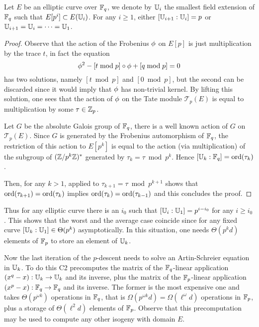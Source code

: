 \begin{proposition}
  \label{th:tower}
  Let $E$ be an elliptic curve over $\mathbb{F}_q$, we denote by $\mathbb{U}_i$ the
  smallest field extension of $\mathbb{F}_q$ such that $E[p^i]\subset
  E(\mathbb{U}_i)$. For any $i\ge1$, either $[\mathbb{U}_{i+1}:\mathbb{U}_i] = p$ or
  $\mathbb{U}_{i+1}=\mathbb{U}_i=\cdots=\mathbb{U}_1$.
\end{proposition}
\begin{proof}
  Observe that the action of the Frobenius $\phi$ on $E[p]$ is
  just multiplication by the trace $t$, in fact the equation
  \[\phi^2 - [t \bmod p]\circ\phi + [q \bmod p] = 0\]
  has two solutions, namely $[t \bmod p]$ and $[0 \bmod p]$, but the
  second can be discarded since it would imply that $\phi$ has
  non-trivial kernel.  By lifting this solution, one sees that the
  action of $\phi$ on the Tate module $\mathcal{T}_p(E)$ is equal
  to multiplication by some $\tau\in\mathbb{Z}_p$.

  Let $G$ be the absolute Galois group of $\mathbb{F}_q$, there is a well
  known action of $G$ on $\mathcal{T}_p(E)$. Since $G$ is generated by
  the Frobenius automorphism of $\mathbb{F}_q$, the restriction of this action
  to $E[p^k]$ is equal to the action (via multiplication) of the
  subgroup of $(\mathbb{Z}/p^k\mathbb{Z})^\ast$ generated by $\tau_k = \tau \bmod
  p^k$. Hence $[\mathbb{U}_k:\mathbb{F}_q] = \operatorname{ord}(\tau_k)$.

  Then, for any $k>1$, \cite[Corollary 4]{Ler97} applied to
  $\tau_{k+1}=\tau\bmod p^{k+1}$ shows that
  $\operatorname{ord}(\tau_{k+1})=\operatorname{ord}(\tau_k)$ implies
  $\operatorname{ord}(\tau_k)=\operatorname{ord}(\tau_{k-1})$ and this concludes the proof.
\end{proof}

Thus for any elliptic curve there is an $i_0$ such that $[\mathbb{U}_i:\mathbb{U}_1] =
p^{i-i_0}$ for any $i \ge i_0$. This shows that the worst and the
average case coincide since for any fixed curve $[\mathbb{U}_k:\mathbb{U}_1] \in
\Theta(p^k)$ asymptotically. In this situation, one needs
$\Theta(p^kd)$ elements of $\mathbb{F}_p$ to store an element of $\mathbb{U}_k$.

Now the last iteration of the $p$-descent needs to solve an
Artin-Schreier equation in $\mathbb{U}_k$. To do this C2 precomputes the
matrix of the $\mathbb{F}_q$-linear application $(x^q-x):\mathbb{U}_k\rightarrow\mathbb{U}_k$
and its inverse, plus the matrix of the $\mathbb{F}_p$-linear application
$(x^p-x):\mathbb{F}_q\rightarrow\mathbb{F}_q$ and its inverse. The former is the most
expensive one and takes $\Theta(p^{\omega k})$ operations in $\mathbb{F}_q$,
that is $\Omega(p^{\omega k}d) = \Omega(\ell^\omega d)$ operations in
$\mathbb{F}_p$, plus a storage of $\Theta(\ell^2d)$ elements of
$\mathbb{F}_p$. Observe that this precomputation may be used to compute any
other isogeny with domain $E$.

